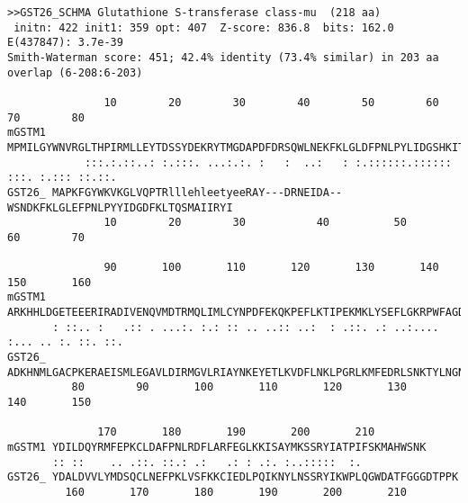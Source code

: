 \begin{footnotesize}
\begin{verbatim}
>>GST26_SCHMA Glutathione S-transferase class-mu  (218 aa)
 initn: 422 init1: 359 opt: 407  Z-score: 836.8  bits: 162.0 E(437847): 3.7e-39
Smith-Waterman score: 451; 42.4% identity (73.4% similar) in 203 aa overlap (6-208:6-203)

               10        20        30        40        50        60        70        80
mGSTM1 MPMILGYWNVRGLTHPIRMLLEYTDSSYDEKRYTMGDAPDFDRSQWLNEKFKLGLDFPNLPYLIDGSHKITQSNAILRYL
            :::.:.::..: :.:::. ...:.:. :   :  ..:   : :.::::::.:::::: :::. :.::: ::.::.
GST26_ MAPKFGYWKVKGLVQPTRlllehleetyeeRAY---DRNEIDA--WSNDKFKLGLEFPNLPYYIDGDFKLTQSMAIIRYI
               10        20        30           40          50        60        70     

               90       100       110       120       130       140       150       160
mGSTM1 ARKHHLDGETEEERIRADIVENQVMDTRMQLIMLCYNPDFEKQKPEFLKTIPEKMKLYSEFLGKRPWFAGDKVTYVDFLA
       : ::.. :   .:: . ...:. :.: :: .. ..:: ..:  : .::. .: ..:.... :... .. :. ::. ::. 
GST26_ ADKHNMLGACPKERAEISMLEGAVLDIRMGVLRIAYNKEYETLKVDFLNKLPGRLKMFEDRLSNKTYLNGNCVTHPDFML
          80        90       100       110       120       130       140       150     

              170       180       190       200       210             
mGSTM1 YDILDQYRMFEPKCLDAFPNLRDFLARFEGLKKISAYMKSSRYIATPIFSKMAHWSNK     
       :: ::    .. .::. ::.: .:   .: : .:. :..:::::  :.               
GST26_ YDALDVVLYMDSQCLNEFPKLVSFKKCIEDLPQIKNYLNSSRYIKWPLQGWDATFGGGDTPPK
         160       170       180       190       200       210        
\end{verbatim}
\end{footnotesize}
